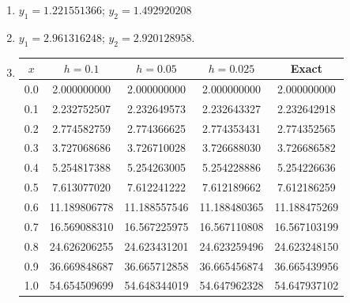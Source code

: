 \documentclass[openany]{book}
\newenvironment{sectionSolutions}{
 \begin{enumerate}[item-label={\thesection.\arabic{enumi}.}]
}{
 \end{enumerate}
}
\begin{document}
\begin{sectionSolutions}
\item
$y_1=1.221551366$; $y_2=1.492920208$


\item
$ y_1=2.961316248$; $y_2=2.920128958$.

\item
{\small
{}
\begin{tabular}{S[table-format=1.1] *4{S[table-format=2.9]} }\toprule
{$x$}&{$h=0.1$}&{$h=0.05$}&{$h=0.025$}&{Exact}\\  &   2.000000000 &  2.000000000 &  2.000000000 &   2.000000000 \\
0.1 &   2.232752507 &  2.232649573 &  2.232643327 &   2.232642918 \\
0.2 &   2.774582759 &  2.774366625 &  2.774353431 &   2.774352565 \\
0.3 &   3.727068686 &  3.726710028 &  3.726688030 &   3.726686582 \\
0.4 &   5.254817388 &  5.254263005 &  5.254228886 &   5.254226636 \\
0.5 &   7.613077020 &  7.612241222 &  7.612189662 &   7.612186259 \\
0.6 &  11.189806778 & 11.188557546 & 11.188480365 &  11.188475269 \\
0.7 &  16.569088310 & 16.567225975 & 16.567110808 &  16.567103199 \\
0.8 &  24.626206255 & 24.623431201 & 24.623259496 &  24.623248150 \\
0.9 &  36.669848687 & 36.665712858 & 36.665456874 &  36.665439956 \\
1.0 &  54.654509699 & 54.648344019 & 54.647962328 &  54.647937102 \\
\bottomrule
\end{tabular}}\bigskip


\end{sectionSolutions}
\end{document}
